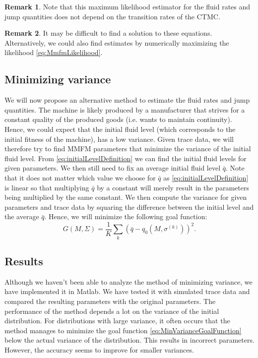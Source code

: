 \documentclass[a4paper]{thesis}
\theoremstyle{definition}
\newtheorem{remark}{Remark}[chapter]
\begin{document}
\begin{remark}
	Note that this maximum likelihood estimator for the fluid rates and jump quantities does not depend on the transition rates of the CTMC.
\end{remark}

\begin{remark}
	It may be difficult to find a solution to these equations.
	Alternatively, we could also find estimates by numerically maximizing the likelihood \eqref{eq:MmfmLikelihood}. 
\end{remark}

\subsection{Minimizing variance}
We will now propose an alternative method to estimate the fluid rates and jump quantities.
The machine is likely produced by a manufacturer that strives for a constant quality of the produced goods (i.e. wants to maintain continuity).
Hence, we could expect that the initial fluid level (which corresponds to the initial fitness of the machine), has a low variance.
Given trace data, we will therefore try to find MMFM parameters that minimize the variance of the initial fluid level.
From \eqref{eq:initialLevelDefinition} we can find the initial fluid levels for given parameters.
We then still need to fix an average initial fluid level $\bar q$.
Note that it does not matter which value we choose for $\bar q$ as \eqref{eq:initialLevelDefinition} is linear so that multiplying $\bar q$ by a constant will merely result in the parameters being multiplied by the same constant.
We then compute the variance for given parameters and trace data by squaring the difference between the initial level and the average $\bar q$.
Hence, we will minimize the following goal function:
\begin{equation}\label{eq:MinVarianceGoalFunction}
G(M,\Sigma)=\frac1K\sum_k \left(\bar q - q_0\left(M,\sigma^{(k)}\right)\right)^2.
\end{equation}

\subsection{Results}
Although we haven't been able to analyze the method of minimizing variance, we have implemented it in Matlab.
We have tested it with simulated trace data and compared the resulting parameters with the original parameters.
The performance of the method depends a lot on the variance of the initial distribution.
For distributions with large variance, it often occurs that the method manages to minimize the goal function \eqref{eq:MinVarianceGoalFunction} below the actual variance of the distribution.
This results in incorrect parameters.
However, the accuracy seems to improve for smaller variances. 
\end{document}
